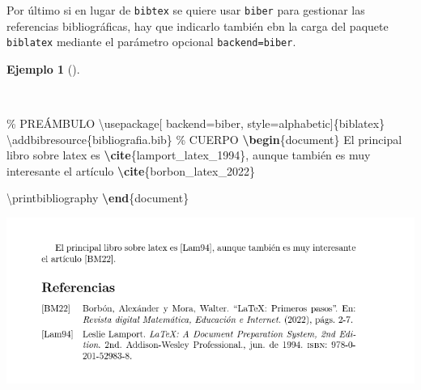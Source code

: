 \documentclass[
  a4paper,
]{scrreport}
\newenvironment{Shaded}{\begin{snugshade}}{\end{snugshade}}
\newcommand{\BuiltInTok}[1]{\textcolor[rgb]{0.00,0.23,0.31}{#1}}
\newcommand{\CommentTok}[1]{\textcolor[rgb]{0.37,0.37,0.37}{#1}}
\newcommand{\ExtensionTok}[1]{\textcolor[rgb]{0.00,0.23,0.31}{#1}}
\newcommand{\FunctionTok}[1]{\textcolor[rgb]{0.28,0.35,0.67}{#1}}
\newcommand{\KeywordTok}[1]{\textcolor[rgb]{0.00,0.23,0.31}{\textbf{#1}}}
\newcommand{\NormalTok}[1]{\textcolor[rgb]{0.00,0.23,0.31}{#1}}
\theoremstyle{definition}
\newtheorem{example}{Ejemplo}[chapter]
\theoremstyle{remark}
\begin{document}
Por último si en lugar de \texttt{bibtex} se quiere usar \texttt{biber}
para gestionar las referencias bibliográficas, hay que indicarlo también
ebn la carga del paquete \texttt{biblatex} mediante el parámetro
opcional \texttt{backend=biber}.

\begin{example}[]\protect\hypertarget{exm-estilos-bibliograficos}{}\label{exm-estilos-bibliograficos}

~

\begin{Shaded}
\begin{Highlighting}[]
\CommentTok{\% PREÁMBULO}
\BuiltInTok{\textbackslash{}usepackage}\NormalTok{[}
\NormalTok{backend=biber, style=alphabetic]\{}\ExtensionTok{biblatex}\NormalTok{\}}
\FunctionTok{\textbackslash{}addbibresource}\NormalTok{\{bibliografia.bib\}}
\CommentTok{\% CUERPO}
\KeywordTok{\textbackslash{}begin}\NormalTok{\{}\ExtensionTok{document}\NormalTok{\}}
\NormalTok{El principal libro sobre latex es }\KeywordTok{\textbackslash{}cite}\NormalTok{\{}\ExtensionTok{lamport\_latex\_1994}\NormalTok{\}, aunque también }
\NormalTok{es muy interesante el artículo }\KeywordTok{\textbackslash{}cite}\NormalTok{\{}\ExtensionTok{borbon\_latex\_2022}\NormalTok{\}}

\FunctionTok{\textbackslash{}printbibliography}
\KeywordTok{\textbackslash{}end}\NormalTok{\{}\ExtensionTok{document}\NormalTok{\}}
\end{Highlighting}
\end{Shaded}

\begin{tcolorbox}[enhanced jigsaw, colframe=quarto-callout-note-color-frame, opacityback=0, title={Salida}, bottomrule=.15mm, left=2mm, coltitle=black, arc=.35mm, leftrule=.75mm, colback=white, rightrule=.15mm, colbacktitle=quarto-callout-note-color!10!white, toprule=.15mm, breakable, opacitybacktitle=0.6, bottomtitle=1mm, toptitle=1mm, titlerule=0mm]

\includegraphics{img/bibliografia/bibliografia2.png}

\end{tcolorbox}

\end{example}
\end{document}
